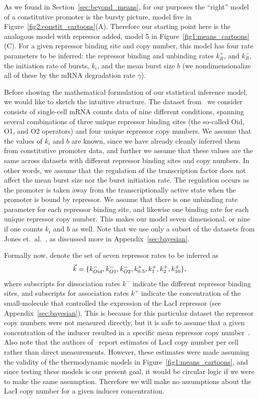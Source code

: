 As we found in Section~\ref{sec:beyond_means}, for our purposes the ``right''
model of a constitutive promoter is the bursty picture, model five in
Figure~\ref{fig2:constit_cartoons}(A). Therefore our starting point here is the
analogous model with repressor added, model 5 in
Figure~\ref{fig1:means_cartoons}(C). For a given repressor binding site and copy
number, this model has four rate parameters to be inferred: the repressor
binding and unbinding rates $k_R^+$, and $k_R^-$, the initiation rate of bursts,
$k_i$, and the mean burst size $b$ (we nondimensionalize all of these by the
mRNA degradation rate $\gamma$).

Before showing the mathematical formulation of our statistical inference model,
we would like to sketch the intuitive structure. The dataset
from~\cite{Jones2014} we consider consists of single-cell mRNA counts data of
nine different conditions, spanning several combinations of three unique
repressor binding sites (the so-called Oid, O1, and O2 operators) and four
unique repressor copy numbers. We assume that the values of $k_i$ and $b$ are
known, since we have already cleanly inferred them from constitutive promoter
data, and further we assume that these values are the same across datasets with
different repressor binding sites and copy numbers. In other words, we assume
that the regulation of the transcription factor does not affect the mean burst
size nor the burst initiation rate. The regulation occurs as the promoter is
taken away from the transcriptionally active state when the promoter is bound by
repressor. We assume that there is one unbinding rate parameter for each
repressor binding site, and likewise one binding rate for each unique repressor
copy number. This makes our model seven dimensional, or nine if one counts $k_i$
and $b$ as well. Note that we use only a subset of the datasets from Jones et.\
al.~\cite{Jones2014}, as discussed more in Appendix~\ref{sec:bayesian}.

Formally now, denote the set of seven repressor rates to be inferred as
\begin{equation}
\vec{k} =\{k_{Oid}^-, k_{O1}^-, k_{O2}^-,
k_{0.5}^+, k_{1}^+, k_{2}^+, k_{10}^+\},
\end{equation}
where subscripts for dissociation rates $k^-$  indicate the different repressor
binding sites, and subscripts for association rates $k^+$ indicate the
concentration of the small-molecule that controlled the expression of the LacI
repressor (see Appendix~\ref{sec:bayesian}). This is because for this particular
dataset the repressor copy numbers were not measured directly, but it is safe to
assume that a given concentration of the inducer resulted in a specific mean
repressor copy number~\cite{Chure2019a}. Also note that the authors
of~\cite{Jones2014} report estimates of LacI copy number per cell rather than
direct measurements. However, these estimates were made assuming the validity of
the thermodynamic models in Figure~\ref{fig1:means_cartoons}, and since testing
these models is our present goal, it would be circular logic if we were to make
the same assumption. Therefore we will make no assumptions about the LacI copy
number for a given inducer concentration.

